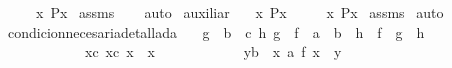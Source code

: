 \begin{isabellebody}
\ \ \ \ \ {\isachardoublequoteopen}{\isasymexists}x{\isachardot}\ {\isasymnot}P{\isacharparenleft}x{\isacharparenright}{\isachardoublequoteclose}\isanewline
%
\isadelimproof
%
\endisadelimproof
%
\isatagproof
{}\isamarkupfalse%
\ assms\isanewline
\ \ \isamarkupfalse%
\ auto%
\endisatagproof
{\isafoldproof}%
%
\isadelimproof
\isanewline
%
\endisadelimproof
\isanewline
{}\isamarkupfalse%
\ auxiliar{\isacharunderscore}{}{\isacharcolon}\isanewline
\ \ \ {\isachardoublequoteopen}{\isasymnot}{\isacharparenleft}{\isasymexists}x{\isachardot}\ P{\isacharparenleft}x{\isacharparenright}{\isacharparenright}{\isachardoublequoteclose}\isanewline
\ \ \ \ \ {\isachardoublequoteopen}{\isasymforall}x{\isachardot}\ {\isasymnot}P{\isacharparenleft}x{\isacharparenright}{\isachardoublequoteclose}\isanewline
%
\isadelimproof
%
\endisadelimproof
%
\isatagproof
{}\isamarkupfalse%
\ assms\isanewline
{}\isamarkupfalse%
\ auto%
\endisatagproof
{\isafoldproof}%
%
\isadelimproof
\isanewline
%
\endisadelimproof
\isanewline
{}\isamarkupfalse%
\ condicion{\isacharunderscore}necesaria{\isacharunderscore}detallada{\isacharcolon}\isanewline
\ \ \ {\isachardoublequoteopen}{\isasymforall}{\isacharparenleft}g\ {\isacharcolon}{\isacharcolon}\ {\isacharprime}b\ {\isasymRightarrow}\ {\isacharprime}c{\isacharparenright}\ h\ {\isachardot}{\isacharparenleft}g\ {\isasymcirc}\ {\isacharparenleft}f\ {\isacharcolon}{\isacharcolon}\ {\isacharprime}a\ {\isasymRightarrow}\ {\isacharprime}b{\isacharparenright}\ {\isacharequal}\ h\ {\isasymcirc}\ f{\isacharparenright}\ {\isasymlongrightarrow}\ {\isacharparenleft}g\ {\isacharequal}\ h{\isacharparenright}{\isachardoublequoteclose}\isanewline
\ \ \ \ \ \ \ \ \ \ \ {\isachardoublequoteopen}{\isasymexists}\ {\isacharparenleft}x{}{\isacharcolon}{\isacharcolon}{\isacharprime}c{\isacharparenright}\ {\isacharparenleft}x{}{\isacharcolon}{\isacharcolon}{\isacharprime}c{\isacharparenright}{\isachardot}\ x{}\ {\isasymnoteq}\ x{}{\isachardoublequoteclose}\isanewline
\ \ \ \ \ \ \ \ \ \ {\isachardoublequoteopen}\ {\isasymforall}\ {\isacharparenleft}y{\isacharcolon}{\isacharcolon}{\isacharprime}b{\isacharparenright}{\isachardot}\ {\isacharparenleft}{\isasymexists}\ {\isacharparenleft}x{\isacharcolon}{\isacharcolon}\ {\isacharprime}a{\isacharparenright}{\isachardot}\ f\ x\ {\isacharequal}\ y{\isacharparenright}{\isachardoublequoteclose}\isanewline

\end{isabellebody}
